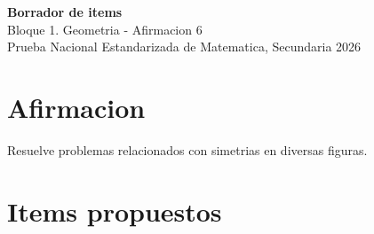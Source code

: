 \documentclass[12pt]{article}
\begin{document}
\begin{center}
  {\Large \textbf{Borrador de items}}\\
  {\large Bloque 1. Geometria - Afirmacion 6}\\[4pt]
  Prueba Nacional Estandarizada de Matematica, Secundaria 2026
\end{center}

\section*{Afirmacion}
Resuelve problemas relacionados con simetrias en diversas figuras.

\section*{Items propuestos}
\end{document}
